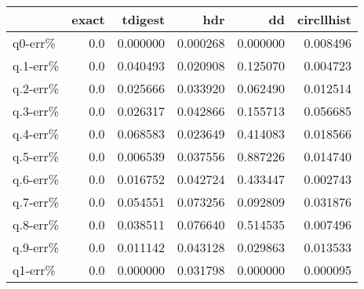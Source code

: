\begin{tabular}{lrrrrr}
\toprule
{} &  exact &   tdigest &       hdr &        dd &  circllhist \\
\midrule
q0-err\%  &    0.0 &  0.000000 &  0.000268 &  0.000000 &    0.008496 \\
q.1-err\% &    0.0 &  0.040493 &  0.020908 &  0.125070 &    0.004723 \\
q.2-err\% &    0.0 &  0.025666 &  0.033920 &  0.062490 &    0.012514 \\
q.3-err\% &    0.0 &  0.026317 &  0.042866 &  0.155713 &    0.056685 \\
q.4-err\% &    0.0 &  0.068583 &  0.023649 &  0.414083 &    0.018566 \\
q.5-err\% &    0.0 &  0.006539 &  0.037556 &  0.887226 &    0.014740 \\
q.6-err\% &    0.0 &  0.016752 &  0.042724 &  0.433447 &    0.002743 \\
q.7-err\% &    0.0 &  0.054551 &  0.073256 &  0.092809 &    0.031876 \\
q.8-err\% &    0.0 &  0.038511 &  0.076640 &  0.514535 &    0.007496 \\
q.9-err\% &    0.0 &  0.011142 &  0.043128 &  0.029863 &    0.013533 \\
q1-err\%  &    0.0 &  0.000000 &  0.031798 &  0.000000 &    0.000095 \\
\bottomrule
\end{tabular}
